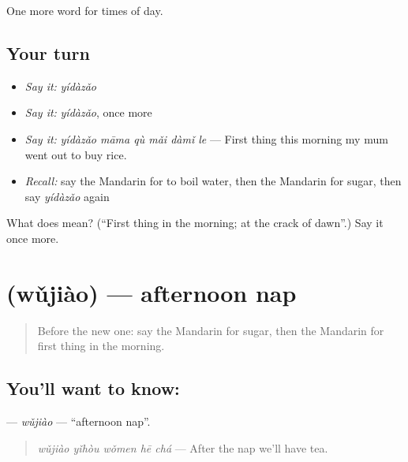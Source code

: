 \begin{grammarlens}[title={What you've built}]
One more word for times of day.
\end{grammarlens}

\subsection*{Your turn}
\begin{itemize}
\raggedright
  \item \emph{Say it:} \emph{yídàzǎo}
  \item \emph{Say it:} \emph{yídàzǎo}, once more
  \item \emph{Say it:} \emph{yídàzǎo māma qù mǎi dàmǐ le} — First thing this morning my mum went out to buy rice.
  \item \emph{Recall:} say the Mandarin for to boil water, then the Mandarin for sugar, then say \emph{yídàzǎo} again
\end{itemize}

\begin{tcolorbox}[breakable,colback=teal!4,colframe=teal!35!black,title={Before you move on}]
What does  mean? (\textquotedblleft{}First thing in the morning; at the crack of dawn\textquotedblright{}.) Say it once more.
\end{tcolorbox}
\section[\texorpdfstring{\zh{午觉} (wǔjiào)}{午觉 (wǔjiào)}]{ (wǔjiào) — afternoon nap}

\label{lesson:ZH-C169-wujiao}



\begin{quote}
Before the new one: say the Mandarin for sugar, then the Mandarin for first thing in the morning.
\end{quote}

\subsection*{You'll want to know: }
\textbf{} — \emph{wǔjiào} — \textquotedblleft{}afternoon nap\textquotedblright{}.

\begin{quote}
\textbf{} \emph{wǔjiào yǐhòu wǒmen hē chá} — After the nap we'll have tea.
\end{quote}

